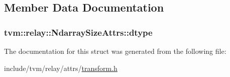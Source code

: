 \subsection{Member Data Documentation}
\subsubsection[{\texorpdfstring{dtype}{dtype}}]{ tvm\+::relay\+::\+Ndarray\+Size\+Attrs\+::dtype}\hypertarget{structtvm_1_1relay_1_1NdarraySizeAttrs_a58d630300fa3ce26c47a6ba7a7362fab}{}\label{structtvm_1_1relay_1_1NdarraySizeAttrs_a58d630300fa3ce26c47a6ba7a7362fab}


The documentation for this struct was generated from the following file\+:\begin{DoxyCompactItemize}
\item 
include/tvm/relay/attrs/\hyperlink{include_2tvm_2relay_2attrs_2transform_8h}{transform.\+h}\end{DoxyCompactItemize}
